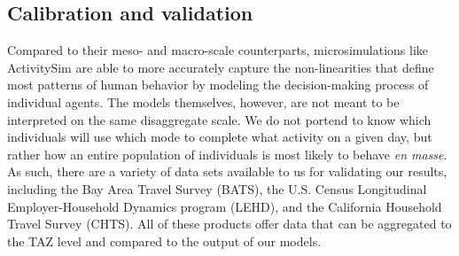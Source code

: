 \subsection{Calibration and validation}
Compared to their meso- and macro-scale counterparts, microsimulations like ActivitySim are able to more accurately capture the non-linearities that define most patterns of human behavior by modeling the decision-making process of individual agents.  The models themselves, however, are not meant to be interpreted on the same disaggregate scale. We do not portend to know which individuals will use which mode to complete what activity on a given day, but rather how an entire population of individuals is most likely to behave \textit{en masse}. As such, there are a variety of data sets available to us for validating our results, including the Bay Area Travel Survey (BATS), the U.S. Census Longitudinal Employer-Household Dynamics program (LEHD), and the California Household Travel Survey (CHTS). All of these products offer data that can be aggregated to the TAZ level and compared to the output of our models.